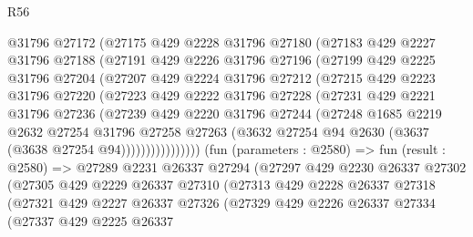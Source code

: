 \begin{lexlean}{R56}
\begin{coremodule}
              @31796
              @27172
              (@27175
                @429
                @2228
                @31796
                @27180
                (@27183
                  @429
                  @2227
                  @31796
                  @27188
                  (@27191
                    @429
                    @2226
                    @31796
                    @27196
                    (@27199
                      @429
                      @2225
                      @31796
                      @27204
                      (@27207
                        @429
                        @2224
                        @31796
                        @27212
                        (@27215
                          @429
                          @2223
                          @31796
                          @27220
                          (@27223
                            @429
                            @2222
                            @31796
                            @27228
                            (@27231
                              @429
                              @2221
                              @31796
                              @27236
                              (@27239
                                @429
                                @2220
                                @31796
                                @27244
                                (@27248
                                  @1685
                                  @2219
                                  @2632
                                  @27254
                                  @31796
                                  @27258
                                  @27263
                                  (@3632 @27254 @94 @2630 (@3637 (@3638 @27254 @94))))))))))))))))
        (fun (parameters : @2580) =>
        fun (result : @2580) =>
        @27289
          @2231
          @26337
          @27294
          (@27297
            @429
            @2230
            @26337
            @27302
            (@27305
              @429
              @2229
              @26337
              @27310
              (@27313
                @429
                @2228
                @26337
                @27318
                (@27321
                  @429
                  @2227
                  @26337
                  @27326
                  (@27329
                    @429
                    @2226
                    @26337
                    @27334
                    (@27337
                      @429
                      @2225
                      @26337

\end{coremodule}
\end{lexlean}
